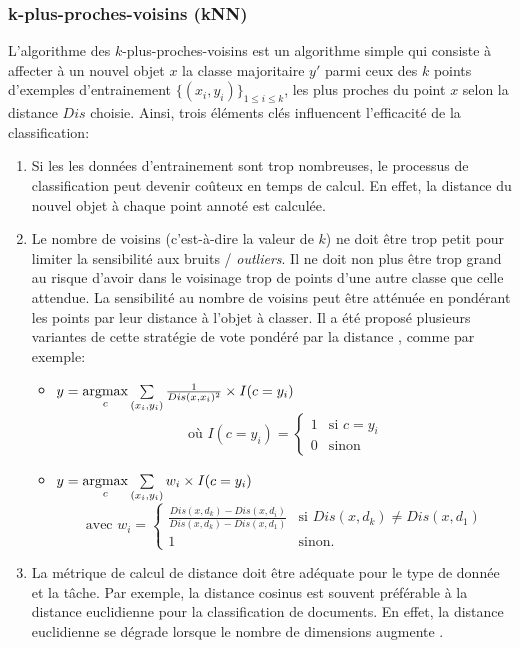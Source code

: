 \subsubsection{k-plus-proches-voisins (kNN)}
L'algorithme des $k$-plus-proches-voisins \citep{cover1967knn} est un algorithme simple qui consiste à affecter à un nouvel objet $x$ la classe majoritaire $y'$ parmi ceux des $k$ points d'exemples d'entrainement $\lbrace (x_i,y_i) \rbrace_{1\leq i \leq k}$, les plus proches du point $x$ selon la distance $Dis$ choisie. Ainsi, trois éléments clés influencent l'efficacité de la classification:
\begin{enumerate}
	\item Si les les données d'entrainement sont trop nombreuses, le processus de classification peut devenir coûteux en temps de calcul. En effet, la distance du nouvel objet à chaque point annoté est calculée.
	\item Le nombre de voisins (c'est-à-dire la valeur de $k$) ne doit être trop petit pour limiter la sensibilité aux bruits / \textit{outliers}. Il ne doit non plus être trop grand au risque d'avoir dans le voisinage trop de points d'une autre classe que celle attendue. La sensibilité au nombre de voisins peut être atténuée en pondérant les points par leur distance à l'objet à classer. Il a été proposé plusieurs variantes de cette stratégie de \og vote pondéré par la distance \fg{}, comme par exemple:
	\begin{itemize}
		\item $y = \mathop{\mathrm{argmax}}\limits\limits_c \sum\limits_{(x_i,y_i)} \frac{1}{Dis(x, x_i)^2} \times I(c = y_i)$ \citep{dudani1976originalwknn} \[\text{ où } I(c=y_i) = \left\lbrace \begin{array}{ll}
		1 & \text{si }c = y_i \\
		0 & \text{sinon}
		\end{array} \right.\]
		\item $y = \mathop{\mathrm{argmax}}\limits\limits_c \sum\limits_{(x_i,y_i)} w_i \times I(c = y_i)$ \citep{gou2011wknn} \[\text{ avec } w_i = \left\lbrace \begin{array}{ll}
		\frac{Dis(x, d_k) - Dis(x, d_i)}{Dis(x, d_k) - Dis(x, d_1)} & \text{si } Dis(x, d_k) \neq Dis(x, d_1) \\
		1 & \text{sinon.}
		\end{array} \right.\]
	\end{itemize}
	 
	\item La métrique de calcul de distance doit être adéquate pour le type de donnée et la tâche. Par exemple, la distance cosinus est souvent préférable à la distance euclidienne pour la classification de documents. En effet, la distance euclidienne se dégrade lorsque le nombre de dimensions augmente \citep{sohangir2017improvedCosSim, aggarwal2001behaviorOfDistHighDim}.
\end{enumerate}

